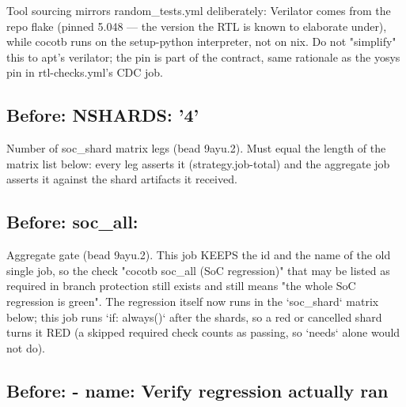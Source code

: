 \begin{record}
\begin{textblock}
Tool sourcing mirrors random_tests.yml deliberately: Verilator comes from the
repo flake (pinned 5.048 — the version the RTL is known to elaborate under),
while cocotb runs on the setup-python interpreter, not on nix. Do not "simplify"
this to apt's verilator; the pin is part of the contract, same rationale as the
yosys pin in rtl-checks.yml's CDC job.
\end{textblock}

\subsection*{Before: NSHARDS: '4'}

\begin{textblock}
Number of soc_shard matrix legs (bead 9ayu.2).  Must equal the length of the matrix list below:
every leg asserts it (strategy.job-total) and the aggregate job asserts it against the shard
artifacts it received.
\end{textblock}

\subsection*{Before: soc\_all:}

\begin{textblock}
Aggregate gate (bead 9ayu.2).  This job KEEPS the id and the name of the old single job, so the
check "cocotb soc_all (SoC regression)" that may be listed as required in branch protection still
exists and still means "the whole SoC regression is green".  The regression itself now runs in
the `soc_shard` matrix below; this job runs `if: always()` after the shards, so a red or cancelled
shard turns it RED (a skipped required check counts as passing, so `needs` alone would not do).
\end{textblock}

\subsection*{Before: - name: Verify regression actually ran}


\end{record}
